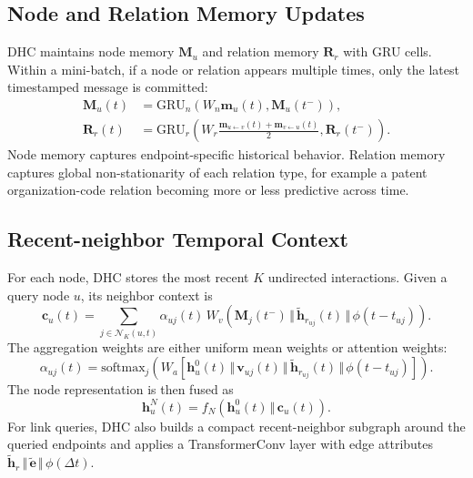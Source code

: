 \documentclass[runningheads]{llncs}
\begin{document}
\subsection{Node and Relation Memory Updates}
DHC maintains node memory $\mathbf{M}_u$ and relation memory $\mathbf{R}_r$ with GRU cells. Within a mini-batch, if a node or relation appears multiple times, only the latest timestamped message is committed:
\begin{align}
\mathbf{M}_u(t) &= \mathrm{GRU}_n\left(W_n\mathbf{m}_{u}(t),\mathbf{M}_u(t^-)\right),\\
\mathbf{R}_r(t) &= \mathrm{GRU}_r\left(W_r\frac{\mathbf{m}_{u\leftarrow v}(t)+\mathbf{m}_{v\leftarrow u}(t)}{2},\mathbf{R}_r(t^-)\right).
\end{align}
Node memory captures endpoint-specific historical behavior. Relation memory captures global non-stationarity of each relation type, for example a patent organization-code relation becoming more or less predictive across time.

\subsection{Recent-neighbor Temporal Context}
For each node, DHC stores the most recent $K$ undirected interactions. Given a query node $u$, its neighbor context is
\begin{equation}
\mathbf{c}_u(t)=\sum_{j\in\mathcal{N}_K(u,t)}\alpha_{uj}(t)\,W_v\left(\mathbf{M}_j(t^-)\,\Vert\,\tilde{\mathbf{h}}_{r_{uj}}(t)\,\Vert\,\phi(t-t_{uj})\right).
\end{equation}
The aggregation weights are either uniform mean weights or attention weights:
\begin{equation}
\alpha_{uj}(t)=\mathrm{softmax}_j\left(W_a\left[\mathbf{h}^{0}_u(t)\,\Vert\,\mathbf{v}_{uj}(t)\,\Vert\,\tilde{\mathbf{h}}_{r_{uj}}(t)\,\Vert\,\phi(t-t_{uj})\right]\right).
\end{equation}
The node representation is then fused as
\begin{equation}
\mathbf{h}^{N}_u(t)=f_N\left(\mathbf{h}^{0}_u(t)\,\Vert\,\mathbf{c}_u(t)\right).
\end{equation}
For link queries, DHC also builds a compact recent-neighbor subgraph around the queried endpoints and applies a TransformerConv layer with edge attributes $\tilde{\mathbf{h}}_r\,\Vert\,\tilde{\mathbf{e}}\,\Vert\,\phi(\Delta t)$.
\end{document}
